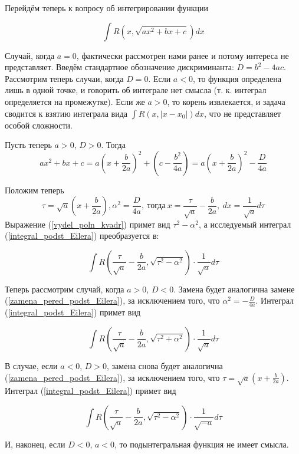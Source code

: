Перейдём теперь к вопросу об интегрировании функции 

\begin{equation}\label{integral_podst_Eilera}
\int R(x,\sqrt{ax^2+bx+c})dx
\end{equation}

Случай, когда $a=0$, фактически рассмотрен нами ранее и потому интереса не представляет.
Введём стандартное обозначение дискриминанта: $D=b^2-4ac$.
Рассмотрим теперь случаи, когда $D=0$.
Если $a<0$, то функция определена лишь в одной точке, и говорить об интеграле нет смысла (т. к. интеграл определяется на промежутке).
Если же $a>0$, то корень извлекается, и задача сводится к взятию интеграла вида $\int R (x,|x-x_0|)dx$, что не представляет особой сложности.

Пусть теперь $a>0$, $D>0$.
Тогда
\begin{equation}\label{vydel_poln_kvadr}
ax^2+bx+c=a\left(x+\frac{b}{2a}\right)^2+\left(c-\frac{b^2}{4a}\right)=a\left(x+\frac{b}{2a}\right)^2-\frac{D}{4a}
\end{equation}

Положим теперь 
\begin{equation}\label{zamena_pered_podst_Eilera}
\tau = \sqrt{a}\left(x+\frac{b}{2a}\right),
\alpha^2=\frac{D}{4a}, ~ 
\text{тогда} ~ 
x=\frac{\tau}{\sqrt{a}}-\frac{b}{2a}, ~ 
dx=\frac{1}{\sqrt{a}}d\tau
\end{equation}
Выражение (\ref{vydel_poln_kvadr}) примет вид $\tau^2-\alpha^2$, а исследуемый интеграл (\ref{integral_podst_Eilera}) преобразуется в:

$$
\int R\left(\frac{\tau}{\sqrt{a}}-\frac{b}{2a},\sqrt{\tau^2-\alpha^2}\right)\cdot\frac{1}{\sqrt{a}}d\tau
$$

Теперь рассмотрим случай, когда $a>0$, $D<0$. Замена будет аналогична замене (\ref{zamena_pered_podst_Eilera}), за исключением того, что $\alpha^2=-\frac{D}{4a}$. Интеграл (\ref{integral_podst_Eilera}) примет вид

$$
\int R\left(\frac{\tau}{\sqrt{a}}-\frac{b}{2a},\sqrt{\tau^2+\alpha^2}\right)\cdot\frac{1}{\sqrt{a}}d\tau
$$

В случае, если $a<0$, $D>0$, замена снова будет аналогична (\ref{zamena_pered_podst_Eilera}), за исключением того, что $\tau = \sqrt{a}\left(x+\frac{b}{2a}\right)$. Интеграл (\ref{integral_podst_Eilera}) примет вид

$$
\int R\left(\frac{\tau}{\sqrt{a}}-\frac{b}{2a},\sqrt{\tau^2-\alpha^2}\right)\cdot\frac{1}{\sqrt{-a}}d\tau
$$

И, наконец, если $D<0$, $a<0$, то подынтегральная функция не имеет смысла.

